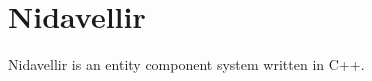 \chapter{Nidavellir}
\hypertarget{index}{}\label{index}
\label{index_md_docs_2docs__readme}%
%
 Nidavellir is an entity component system written in C++. 